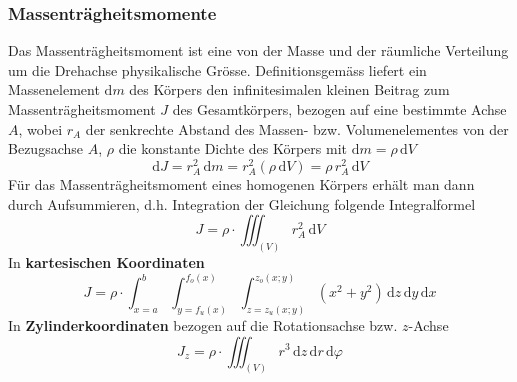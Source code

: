 \subsubsection{Massenträgheitsmomente}
Das Massenträgheitsmoment ist eine von der Masse und der räumliche Verteilung um die Drehachse physikalische Grösse. Definitionsgemäss liefert ein Massenelement $\text{d}m$ des Körpers den infinitesimalen kleinen Beitrag zum Massenträgheitsmoment $J$ des Gesamtkörpers, bezogen auf eine bestimmte Achse $A$, wobei $r_A$ der senkrechte Abstand des Massen- bzw. Volumenelementes von der Bezugsachse $A$, $\rho$ die konstante Dichte des Körpers mit $\text{d}m=\rho\,\text{d}V$ 
\begin{equation}
\boxed{\text{d}J=r_A^2\,\text{d}m=r_A^2\left(\rho\,\text{d}V\right)=\rho \,r_A^2\,\text{d}V}
\end{equation}
Für das Massenträgheitsmoment eines homogenen Körpers erhält man dann durch Aufsummieren, d.h. Integration der Gleichung folgende Integralformel
\begin{equation}
\boxed{J=\rho\cdot \displaystyle \iiint_{\left(V\right)}r_A^2\,\text{d}V}
\end{equation}
In \textbf{kartesischen Koordinaten}
\begin{equation}
\boxed{J=\rho\cdot \displaystyle \int_{x=a}^{b}\displaystyle \int_{y=f_u\left(x\right)}^{f_o\left(x\right)}\displaystyle \int_{z=z_u\left(x; y\right)}^{z_o\left(x; y\right)}\left(x^2+y^2\right)\,\text{d}z\,\text{d}y\,\text{d}x}
\end{equation}
In \textbf{Zylinderkoordinaten} bezogen auf die Rotationsachse bzw. $z$-Achse
\begin{equation}
\boxed{J_z=\rho\cdot \displaystyle \iiint_{\left(V\right)}r^3\,\text{d}z\,\text{d}r\,\text{d}\varphi}
\end{equation}